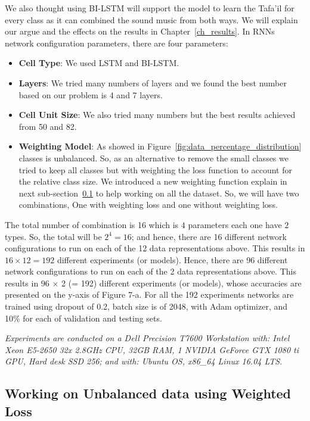 We also thought using BI-LSTM will support the model to learn the Tafa'il for every class as it can combined the sound music from both ways. We will explain our argue and the effects on the results in Chapter~\ref{ch_results}.
In RNNs network configuration parameters, there are four parameters:
\begin{itemize}
\item \textbf{Cell Type}: We used LSTM and BI-LSTM.
\item \textbf{Layers}: We tried many numbers of layers and we found the best number based on our problem is 4 and 7 layers.
\item \textbf{Cell Unit Size}: We also tried many numbers but the best results achieved from 50 and 82.
\item \textbf{Weighting Model}: As showed in Figure~\ref{fig:data_percentage_distribution} classes is unbalanced. So, as an alternative to remove the small classes we tried to keep all classes but with weighting the loss function to account for the relative class size. We introduced a new weighting function explain in next sub-section~\ref{sec_w_loss} to help working on all the dataset. So, we will have two combinations, One with weighting loss and one without weighting loss.
  
\end{itemize}

The total number of combination is 16 which is $4$ parameters each one have $2$ types. So, the total will be $2^4=16$; and hence, there are 16 different network configurations to run on each of the 12 data representations above. This results in $16 \times 12 = 192$ different experiments (or models). Hence, there are 96 different network configurations to run on each of the 2 data representations above. This results in 96 × 2 (= 192) different experiments (or models), whose accuracies are presented on the y-axis of Figure 7-a.%
For all the 192 experiments networks are trained using dropout of 0.2, batch size is of 2048, with Adam optimizer, and 10\% for each of validation and testing sets.

\textit{Experiments are conducted on a Dell Precision T7600 Workstation with: Intel Xeon E5-2650 32x 2.8GHz CPU, 32GB RAM, 1 NVIDIA GeForce GTX 1080 ti GPU, Hard desk SSD 256; and with: Ubuntu OS, x86\_64 Linux 16.04 LTS.}

\newpage
\subsection{Working on Unbalanced data using Weighted Loss}\label{sec_w_loss}

